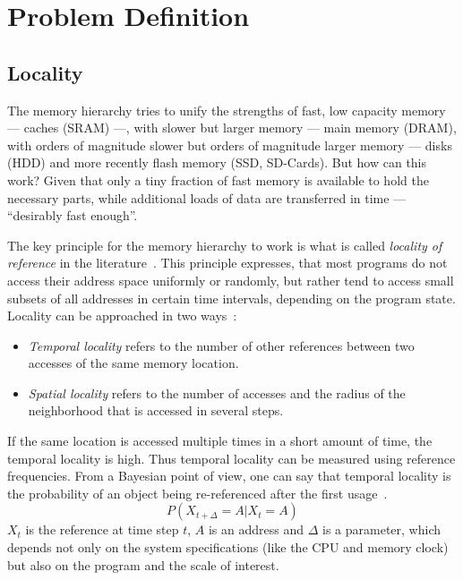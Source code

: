 \chapter{Problem Definition}\label{\positionnumber}
\section{Locality}\label{\positionnumber}
    The memory hierarchy tries to unify the strengths of fast, low capacity memory --- caches (SRAM) ---, with slower but larger memory --- main memory (DRAM), with orders of magnitude slower but orders of magnitude larger memory --- disks (HDD) and more recently flash memory (SSD, SD-Cards).
    But how can this work? 
    Given that only a tiny fraction of fast memory is available to hold the necessary parts, while additional loads of data are transferred in time --- ``desirably fast enough''.
    
    The key principle for the memory hierarchy to work is what is called \textit{locality of reference} in the literature~\autocite{jacob2010memory, tanenbaum2015modern}. 
    This principle expresses, that most programs do not access their address space uniformly or randomly, but rather tend to access small subsets of all addresses in certain time intervals, depending on the program state.
    Locality can be approached in two ways~\autocite{denning2006locality}: 
    
    \begin{itemize}
     \item \textit{Temporal locality} refers to the number of other references between two accesses of the same memory location. 
     \item \textit{Spatial locality} refers to the number of accesses and the radius of the neighborhood that is accessed in several steps.
    \end{itemize}
    
    If the same location is accessed multiple times in a short amount of time, the temporal locality is high.
    Thus temporal locality can be measured using reference frequencies.
    From a Bayesian point of view, one can say that temporal locality is the probability of an object being re-referenced after the first usage~\autocite{gupta2013locality}. 
    \[ P (X_{t + \Delta} = A | X_t = A) \]
    $X_t$ is the reference at time step $t$, $A$ is an address and $\Delta$ is a parameter, which depends not only on the system specifications (like the CPU and memory clock) but also on the program and the scale of interest.
    
